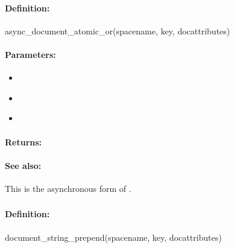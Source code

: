 \paragraph{Definition:}
\begin{rubycode}
async_document_atomic_or(spacename, key, docattributes)
\end{rubycode}

\paragraph{Parameters:}
\begin{itemize}[noitemsep]
\item {}\\

\item {}\\

\item {}\\

\end{itemize}

\paragraph{Returns:}


\paragraph{See also:}  This is the asynchronous form of .

\pagebreak
\subsubsection{}
\label{api:ruby:document_string_prepend}


\paragraph{Definition:}
\begin{rubycode}
document_string_prepend(spacename, key, docattributes)
\end{rubycode}

